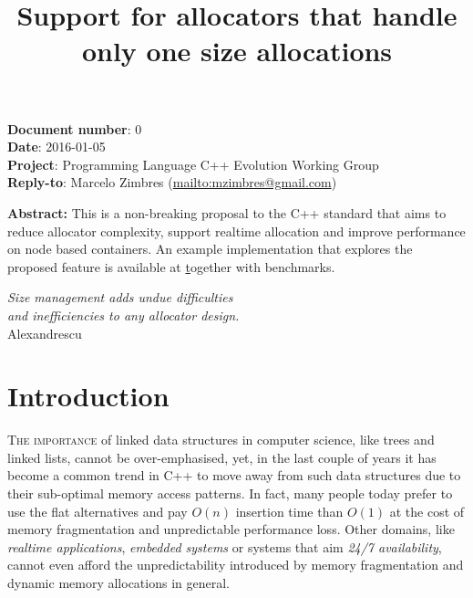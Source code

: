 \documentclass[11pt]{article}
\begin{document}
\date{}
\title{\bf Support for allocators that handle only one size
allocations}

\vspace{-2cm}
\maketitle


\noindent
{\bf Document number}:  0 \\
{\bf Date}:  2016-01-05 \\
{\bf Project}: Programming Language C++ Evolution Working Group \\
{\bf Reply-to}: Marcelo Zimbres (\url{mailto:mzimbres@gmail.com}) 

\vspace{1cm}

\noindent
{\bf Abstract: }This is a non-breaking proposal to the C++ standard
that aims to reduce allocator complexity, support realtime allocation
and improve performance on node based containers. An example
implementation that explores the proposed feature is available at
\href{https://github.com/mzimbres/rtcpp}
together with benchmarks.

\tableofcontents

\begin{flushright}
\noindent
{\it Size management adds undue difficulties \\
     and inefficiencies to any allocator design.} \\
Alexandrescu \\
\medskip
{\it }
\end{flushright}
\medskip

\section{Introduction}
\textsc{The importance} of linked data structures in computer science,
like trees and linked lists, cannot be over-emphasised, yet, in the
last couple of years it has become a common trend in C++ to move away
from such data structures due to their sub-optimal memory access
patterns.  In fact, many people today prefer to use the flat
alternatives and pay $O(n)$ insertion time than $O(1)$ at the cost of
memory fragmentation and unpredictable performance loss. Other
domains, like {\it realtime applications}, {\it embedded systems} or
systems that aim {\it 24/7 availability}, cannot even afford the
unpredictability introduced by memory fragmentation and dynamic
memory allocations in general.
\end{document}
